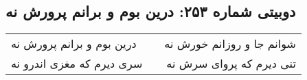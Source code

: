 \begin{center}
\section*{دوبیتی شماره ۲۵۳: درین بوم و برانم پرورش نه}
\label{sec:253}
\begin{longtable}{l p{0.5cm} r}
درین بوم و برانم پرورش نه
&&
شوانم جا و روزانم خورش نه
\\
سری دیرم که مغزی اندرو نه
&&
تنی دیرم که پروای سرش نه
\\
\end{longtable}
\end{center}
